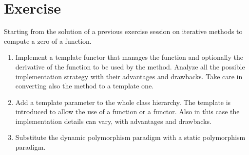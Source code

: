 \section*{Exercise}

Starting from the solution of a previous exercise session on iterative methods
to compute a zero of a function.

\begin{enumerate}

  \item Implement a template functor that manages the function and optionally
  the derivative of the function to be used by the method. Analyze all the
  possible implementation strategy with their advantages and drawbacks. Take
  care in converting also the  method to a template one.

  \item Add a template parameter to the whole class hierarchy. The template is
  introduced to allow the use of a function or a functor. Also in this case the
  implementation details can vary, with advantages and drawbacks.

  \item Substitute the dynamic polymorphism paradigm with a static polymorphism
  paradigm.

\end{enumerate}

